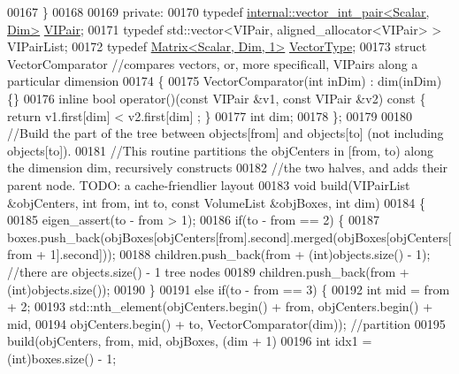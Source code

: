 \begin{DoxyCode}
00167   \}
00168 
00169 \textcolor{keyword}{private}:
00170   \textcolor{keyword}{typedef} \hyperlink{struct_eigen_1_1internal_1_1vector__int__pair}{internal::vector\_int\_pair<Scalar, Dim>} 
      \hyperlink{struct_eigen_1_1internal_1_1vector__int__pair}{VIPair};
00171   \textcolor{keyword}{typedef} std::vector<VIPair, aligned\_allocator<VIPair> > VIPairList;
00172   \textcolor{keyword}{typedef} \hyperlink{group___core___module}{Matrix<Scalar, Dim, 1>} \hyperlink{group___core___module}{VectorType};
00173   \textcolor{keyword}{struct }VectorComparator \textcolor{comment}{//compares vectors, or, more specificall, VIPairs along a particular dimension}
00174   \{
00175     VectorComparator(\textcolor{keywordtype}{int} inDim) : dim(inDim) \{\}
00176     \textcolor{keyword}{inline} \textcolor{keywordtype}{bool} operator()(\textcolor{keyword}{const} VIPair &v1, \textcolor{keyword}{const} VIPair &v2)\textcolor{keyword}{ const }\{ \textcolor{keywordflow}{return} v1.first[dim] < v2.first[dim]
      ; \}
00177     \textcolor{keywordtype}{int} dim;
00178   \};
00179 
00180   \textcolor{comment}{//Build the part of the tree between objects[from] and objects[to] (not including objects[to]).}
00181   \textcolor{comment}{//This routine partitions the objCenters in [from, to) along the dimension dim, recursively constructs}
00182   \textcolor{comment}{//the two halves, and adds their parent node.  TODO: a cache-friendlier layout}
00183   \textcolor{keywordtype}{void} build(VIPairList &objCenters, \textcolor{keywordtype}{int} from, \textcolor{keywordtype}{int} to, \textcolor{keyword}{const} VolumeList &objBoxes, \textcolor{keywordtype}{int} dim)
00184   \{
00185     eigen\_assert(to - from > 1);
00186     \textcolor{keywordflow}{if}(to - from == 2) \{
00187       boxes.push\_back(objBoxes[objCenters[from].second].merged(objBoxes[objCenters[from + 1].second]));
00188       children.push\_back(from + (\textcolor{keywordtype}{int})objects.size() - 1); \textcolor{comment}{//there are objects.size() - 1 tree nodes}
00189       children.push\_back(from + (\textcolor{keywordtype}{int})objects.size());
00190     \}
00191     \textcolor{keywordflow}{else} \textcolor{keywordflow}{if}(to - from == 3) \{
00192       \textcolor{keywordtype}{int} mid = from + 2;
00193       std::nth\_element(objCenters.begin() + from, objCenters.begin() + mid,
00194                         objCenters.begin() + to, VectorComparator(dim)); \textcolor{comment}{//partition}
00195       build(objCenters, from, mid, objBoxes, (dim + 1) %
00196       \textcolor{keywordtype}{int} idx1 = (int)boxes.size() - 1;

\end{DoxyCode}
